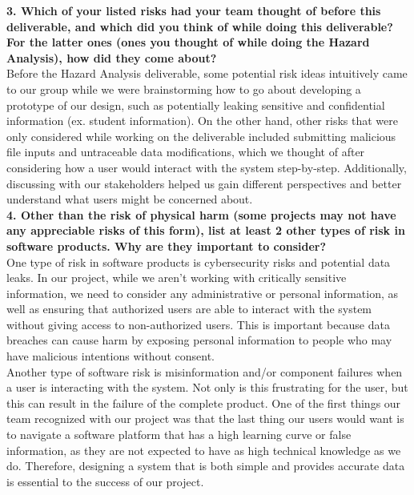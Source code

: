 \documentclass{article}
\begin{document}
\noindent \textbf{3. Which of your listed risks had your team thought of before this
deliverable, and which did you think of while doing this deliverable? For
the latter ones (ones you thought of while doing the Hazard Analysis), how
did they come about?}\\

\noindent Before the Hazard Analysis deliverable, some potential risk ideas intuitively came to our 
group while we were brainstorming how to go about developing a prototype of our design, such 
as potentially leaking sensitive and confidential information (ex. student information). On 
the other hand, other risks that were only considered while working on the deliverable included 
submitting malicious file inputs and untraceable data modifications, which we thought of after 
considering how a user would interact with the system step-by-step. Additionally, discussing 
with our stakeholders helped us gain different perspectives and better understand what users 
might be concerned about.\\


\noindent \textbf{4. Other than the risk of physical harm (some projects may not have any
appreciable risks of this form), list at least 2 other types of risk in
software products. Why are they important to consider?}\\

\noindent One type of risk in software products is cybersecurity risks and potential data leaks. In our 
project, while we aren’t working with critically sensitive information, we need to consider any 
administrative or personal information, as well as ensuring that authorized users are able to 
interact with the system without giving access to non-authorized users. This is important 
because data breaches can cause harm by exposing personal information to people who may have 
malicious intentions without consent.\\

\noindent Another type of software risk is misinformation and/or component failures when a user is 
interacting with the system. Not only is this frustrating for the user, but this can result 
in the failure of the complete product. One of the first things our team recognized with our 
project was that the last thing our users would want is to navigate a software platform that 
has a high learning curve or false information, as they are not expected to have as high 
technical knowledge as we do. Therefore, designing a system that is both simple and provides 
accurate data is essential to the success of our project.
\end{document}
